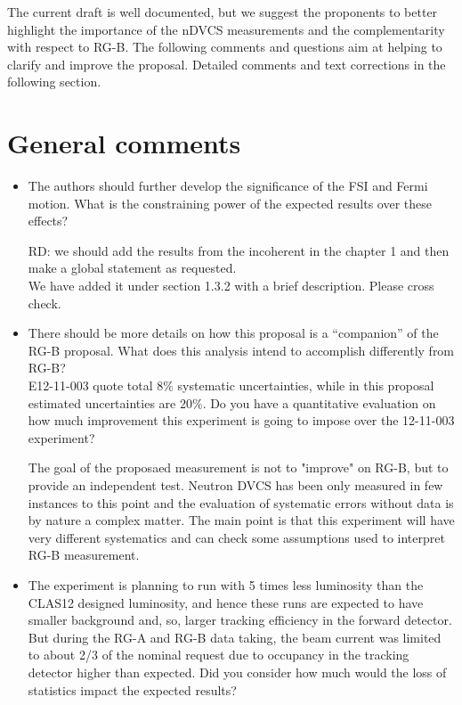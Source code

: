The current draft is well documented, but we suggest the proponents to better 
highlight the importance of the nDVCS measurements and the complementarity with 
respect to RG-B.
The following comments and questions aim at helping to clarify and improve the 
proposal. Detailed comments and text corrections in the following section.
 
 
 \section*{General comments}
 
  \begin{itemize}
  
\item The authors should further develop the significance of the FSI and Fermi 
   motion. What is the constraining power of the expected results over these 
        effects?

{\color{red} RD: we should add the results from the incoherent in the chapter 1 
        and then make a global statement as requested.\\
        We have added it under section 1.3.2 with a brief description.  Please 
        cross check.}

\item There should be more details  on how this  proposal is a ``companion'' of 
   the RG-B proposal. What does this analysis intend to accomplish differently 
        from RG-B?  \\ E12-11-003 quote total $8\%$ systematic uncertainties, 
        while in this proposal estimated uncertainties are $20\%$. Do you have 
        a quantitative evaluation on how much improvement this experiment is 
        going to impose over the 12-11-003 experiment?

 {\color{red} The goal of the proposaed measurement is not to "improve" on 
        RG-B, but to provide an independent test. Neutron DVCS has been only 
        measured in few instances to this point and the evaluation of 
        systematic errors without data is by nature a complex matter. The main 
        point is that this experiment will have very different systematics and 
        can check some assumptions used to interpret RG-B measurement.}
 
 \item The experiment is planning to run with 5 times less luminosity than the 
    CLAS12 designed luminosity, and hence these runs are expected to have 
        smaller background and, so, larger tracking efficiency in the forward 
        detector. But during the RG-A and RG-B data taking, the beam current 
        was limited to about 2/3 of the nominal request due to occupancy in the 
        tracking detector higher than expected. Did you consider how much would 
        the loss of statistics impact the expected results? 
 

\end{itemize}
